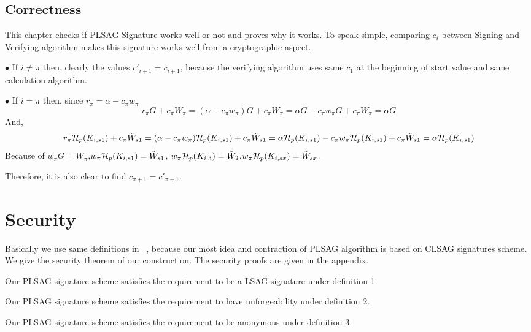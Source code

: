 \subsection{Correctness}
    This chapter checks if PLSAG Signature works well or not and proves why it works. To speak simple, comparing $c_{i}$ between Signing and Verifying algorithm makes this signature works well from a cryptographic aspect.
    
    $\bullet$ If $i\neq \pi $ then, clearly the values $c'_{i+1}=c_{i+1}$, 
    because the verifying algorithm uses same $c_{1}$ at the beginning of start value and same calculation algorithm.
    
    $\bullet$ If $i=\pi$ then, since $r_{\pi}=\alpha - c_{\pi}w_{\pi}$\\
    $$r_{\pi}G+c_{\pi}W_{\pi}=(\alpha - c_{\pi}w_{\pi})G+ c_{\pi}W_{\pi}=\alpha G - c_{\pi}w_{\pi}G + c_{\pi}W_{\pi}=\alpha G$$
    And,
    $$r_{\pi}{\cal H}_{p}(K_{i,s1})+c_{\pi} \tilde{W}_{s1}= (\alpha - c_{\pi}w_{\pi}){\cal H}_{p}(K_{i,s1})+c_{\pi} \tilde{W}_{s1}= \alpha {\cal H}_{p}(K_{i,s1}) - c_{\pi}w_{\pi}{\cal H}_{p}(K_{i,s1})+c_{\pi} \tilde{W}_{s1}= \alpha {\cal H}_{p}(K_{i,s1})$$
    Because of $w_{\pi}G=W_{\pi}$,$w_{\pi}{\cal H}_{p}(K_{i,s1})=\tilde{W}_{s1}$, $w_{\pi}{\cal H}_{p}(K_{i,3})=\tilde{W}_{2}$,$w_{\pi}{\cal H}_{p}(K_{i,sx})=\tilde{W}_{sx}$.
    
    Therefore, it is also clear to find $c_{\pi + 1}=c'_{\pi +1}$.

\section{Security}
    Basically we use same definitions in ~\cite{clsag}, because our most idea and contraction of PLSAG algorithm is based on CLSAG signatures scheme. We give the security theorem of our construction. The security proofs are given in the appendix.
    
    \begin{theorem}
    Our PLSAG signature scheme satisfies the requirement to be a LSAG signature under definition 1.
    \end{theorem}
    
    \begin{theorem}[unforgeable]
    Our PLSAG signature scheme satisfies the requirement to have unforgeability under definition 2.
    \end{theorem}
    
    \begin{theorem}[anonymous]
    Our PLSAG signature scheme satisfies the requirement to be anonymous under definition 3.
    \end{theorem}
    
